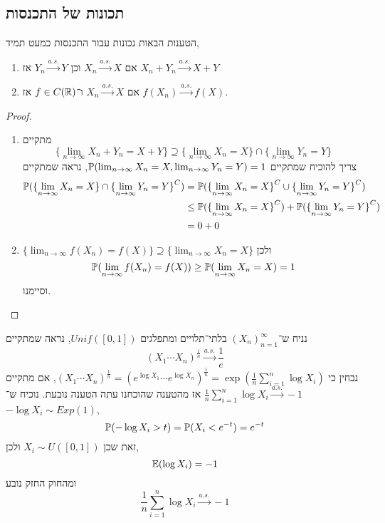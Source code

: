\subsection{תכונות של התכנסות}
\begin{proposition}
	הטענות הבאות נכונות עבור התכנסות כמעט תמיד,
	\begin{enumerate}
		\item אם $X_n \xrightarrow{a.s.} X$ וכן $Y_n \xrightarrow{a.s.} Y$ אז $X_n + Y_n \xrightarrow{a.s.} X + Y$
		\item אם $X_n \xrightarrow{a.s.} X$ ו־$f \in C(\mathbb{R})$ אז $f(X_n) \xrightarrow{a.s.} f(X)$.
	\end{enumerate}
\end{proposition}
\begin{proof}
	\begin{enumerate}
		\item מתקיים
			\[
				\{ \lim_{n \to \infty} X_n + Y_n = X + Y \}
				\supseteq \{ \lim_{n \to \infty} X_n = X \} \cap \{ \lim_{n \to \infty} Y_n = Y \}
			\]
			צריך להוכיח שמתקיים $\mathbb{P}(\lim_{n \to \infty} X_n = X, \lim_{n \to \infty} Y_n = Y) = 1$,
			נראה שמתקיים
			\begin{align*}
				\mathbb{P}({\{ \lim_{n \to \infty} X_n = X \} \cap \{ \lim_{n \to \infty} Y_n = Y \}}^C)
				& = \mathbb{P}({\{ \lim_{n \to \infty} X_n = X \}}^C \cup {\{ \lim_{n \to \infty} Y_n = Y \}}^C) \\
				& \le \mathbb{P}({\{ \lim_{n \to \infty} X_n = X \}}^C) + \mathbb{P}({\{ \lim_{n \to \infty} Y_n = Y \}}^C) \\
				& = 0 + 0
			\end{align*}
		\item $\{ \lim_{n \to \infty} f(X_n) = f(X) \} \supseteq \{ \lim_{n \to \infty} X_n = X \}$ ולכן
			\[
				\mathbb{P}(\lim_{n \to \infty} f(X_n) = f(X))
				\ge \mathbb{P}(\lim_{n \to \infty} X_n = X)
				= 1
			\]
			וסיימנו.
	\end{enumerate}
\end{proof}
\begin{example}
	נניח ש־${(X_n)}_{n = 1}^\infty$ בלתי־תלויים ומתפלגים $Unif([0, 1])$, נראה שמתקיים
	\[
		{(X_1 \cdots X_n)}^{\frac{1}{n}}
		\xrightarrow{a.s.} \frac{1}{e}
	\]
	נבחין כי ${(X_1 \cdots X_n)}^{\frac{1}{n}} = {(e^{\log X_1} \cdots e^{\log X_n})}^{\frac{1}{n}} = \exp(\frac{1}{n} \sum_{i = 1}^{n} \log X_i)$,
	אם מתקיים $\frac{1}{n} \sum_{i = 1}^{n} \log X_i \xrightarrow{a.s.} -1$ אז מהטענה שהוכחנו עתה הטענה נובעת.
	נוכיח ש־$-\log X_i \sim Exp(1)$,
	\[
		\mathbb{P}(-\log X_i > t)
		= \mathbb{P}(X_i < e^{-t})
		= e^{-t}
	\]
	זאת שכן $X_i \sim U([0, 1])$ ולכן,
	\[
		\mathbb{E}(\log X_i) = -1
	\]
	ומהחוק החזק נובע
	\[
		\frac{1}{n} \sum_{i = 1}^{n} \log X_i
		\xrightarrow{a.s.} -1
	\]
\end{example}

